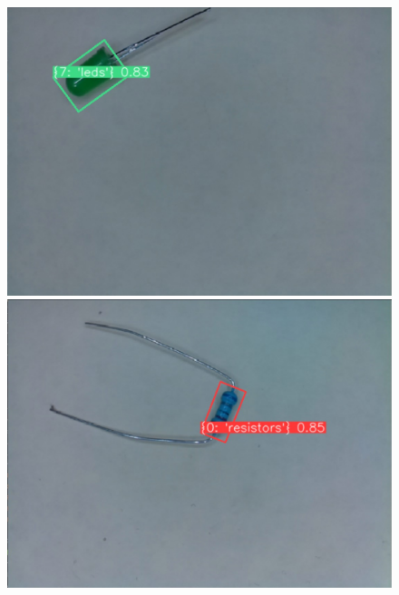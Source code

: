 \begin{figure}[H]
  \centering
  \begin{minipage}{0.49\textwidth}
    \centering
    \includegraphics[width=\textwidth]{imgs/cv/2024-05-21_13-04-03_python.jpg}
  \end{minipage}
  \hfill
  \begin{minipage}{0.49\textwidth}
      \centering
      \includegraphics[width=\textwidth]{imgs/cv/2024-05-21_13-04-06_python.jpg}
  \end{minipage}
  \par\medskip
  \begin{minipage}{0.49\textwidth}
    \centering

\end{minipage}
\end{figure}
